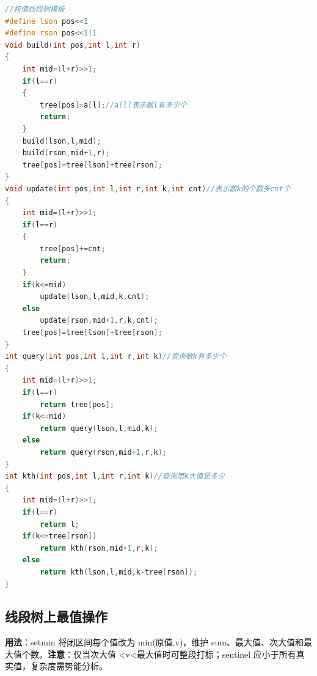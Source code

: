 \documentclass[a4paper,9pt]{extarticle}
\begin{document}
\begin{lstlisting}[language={C++}]
//权值线段树模板
#define lson pos<<1
#define rson pos<<1|1
void build(int pos,int l,int r)
{
	int mid=(l+r)>>1;
	if(l==r)
	{
		tree[pos]=a[l];//a[l]表示数l有多少个
		return;
	}
	build(lson,l,mid);
	build(rson,mid+1,r);
	tree[pos]=tree[lson]+tree[rson];
}
void update(int pos,int l,int r,int k,int cnt)//表示数k的个数多cnt个
{
	int mid=(l+r)>>1;
	if(l==r)
	{
		tree[pos]+=cnt;
		return;
	}
	if(k<=mid)
		update(lson,l,mid,k,cnt);
	else	
		update(rson,mid+1,r,k,cnt);
	tree[pos]=tree[lson]+tree[rson];
}
int query(int pos,int l,int r,int k)//查询数k有多少个
{
	int mid=(l+r)>>1;
	if(l==r)
		return tree[pos];
	if(k<=mid)
		return query(lson,l,mid,k);
	else
		return query(rson,mid+1,r,k);
}
int kth(int pos,int l,int r,int k)//查询第k大值是多少
{
	int mid=(l+r)>>1;
	if(l==r)
		return l;
	if(k<=tree[rson])
		return kth(rson,mid+1,r,k);
	else
		return kth(lson,l,mid,k-tree[rson]);
}
\end{lstlisting}

\subsection{线段树上最值操作}

\textbf{用法}：setmin 将闭区间每个值改为 min(原值,v)，维护 sum、最大值、次大值和最大值个数。\textbf{注意}：仅当次大值 <\allowbreak{}v<最大值时可整段打标；sentinel 应小于所有真实值，复杂度需势能分析。
\end{document}

